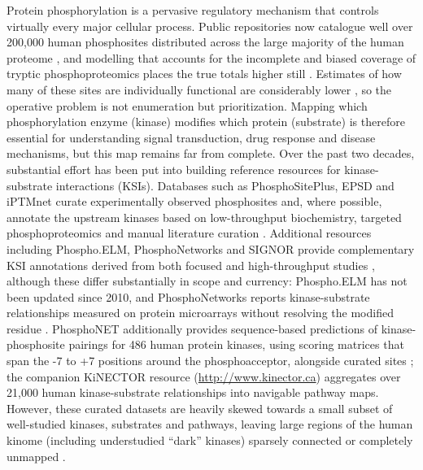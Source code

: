 \documentclass[
  number,
  preprint,
  onecolumn]{elsarticle}
\begin{document}
Protein phosphorylation is a pervasive regulatory mechanism that
controls virtually every major cellular process. Public repositories now
catalogue well over 200,000 human phosphosites distributed across the
large majority of the human proteome
\citep{Hornbeck2019-psp, Vlastaridis2017-hz}, and modelling that
accounts for the incomplete and biased coverage of tryptic
phosphoproteomics places the true totals higher still
\citep{Vlastaridis2017-hz, Sharma2014-ud}. Estimates of how many of
these sites are individually functional are considerably lower
\citep{Landry2009-wf, Ochoa2020-og, Kalyuzhnyy2022-ph}, so the operative
problem is not enumeration but prioritization. Mapping which
phosphorylation enzyme (kinase) modifies which protein (substrate) is
therefore essential for understanding signal transduction, drug response
and disease mechanisms, but this map remains far from complete. Over the
past two decades, substantial effort has been put into building
reference resources for kinase-substrate interactions (KSIs). Databases
such as PhosphoSitePlus, EPSD and iPTMnet curate experimentally observed
phosphosites and, where possible, annotate the upstream kinases based on
low-throughput biochemistry, targeted phosphoproteomics and manual
literature curation \citep{Hornbeck2019-psp, Chen2025-bt, Huang2018-bq}.
Additional resources including Phospho.ELM, PhosphoNetworks and SIGNOR
provide complementary KSI annotations derived from both focused and
high-throughput studies \citep{Dinkel2011-pp, Hu2014-dp, Licata2020-fm},
although these differ substantially in scope and currency: Phospho.ELM
has not been updated since 2010, and PhosphoNetworks reports
kinase-substrate relationships measured on protein microarrays without
resolving the modified residue \citep{Newman2013-pn, Hu2014-dp}.
PhosphoNET additionally provides sequence-based predictions of
kinase-phosphosite pairings for 486 human protein kinases, using scoring
matrices that span the -7 to +7 positions around the phosphoacceptor,
alongside curated sites \citep{Safaei2011-pn}; the companion KiNECTOR
resource (\url{http://www.kinector.ca}) aggregates over 21,000 human
kinase-substrate relationships into navigable pathway maps. However,
these curated datasets are heavily skewed towards a small subset of
well-studied kinases, substrates and pathways, leaving large regions of
the human kinome (including understudied ``dark'' kinases) sparsely
connected or completely unmapped \citep{Berginski2021-so}.
\end{document}
